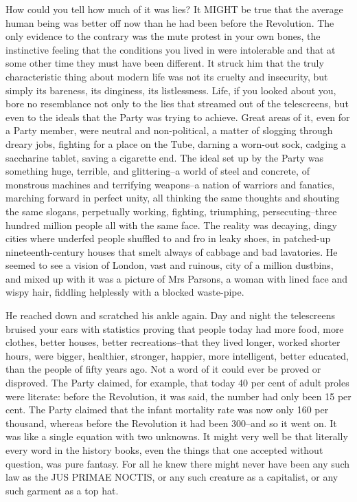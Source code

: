 \documentclass{article}
\begin{document}
How could you tell how much of it was lies? It MIGHT be true that the
average human being was better off now than he had been before the
Revolution. The only evidence to the contrary was the mute protest in your
own bones, the instinctive feeling that the conditions you lived in were
intolerable and that at some other time they must have been different. It
struck him that the truly characteristic thing about modern life was not
its cruelty and insecurity, but simply its bareness, its dinginess, its
listlessness. Life, if you looked about you, bore no resemblance not only
to the lies that streamed out of the telescreens, but even to the ideals
that the Party was trying to achieve. Great areas of it, even for a Party
member, were neutral and non-political, a matter of slogging through dreary
jobs, fighting for a place on the Tube, darning a worn-out sock, cadging
a saccharine tablet, saving a cigarette end. The ideal set up by the
Party was something huge, terrible, and glittering--a world of steel
and concrete, of monstrous machines and terrifying weapons--a nation of
warriors and fanatics, marching forward in perfect unity, all thinking the
same thoughts and shouting the same slogans, perpetually working, fighting,
triumphing, persecuting--three hundred million people all with the same
face. The reality was decaying, dingy cities where underfed people shuffled
to and fro in leaky shoes, in patched-up nineteenth-century houses that
smelt always of cabbage and bad lavatories. He seemed to see a vision of
London, vast and ruinous, city of a million dustbins, and mixed up with it
was a picture of Mrs Parsons, a woman with lined face and wispy hair,
fiddling helplessly with a blocked waste-pipe.

He reached down and scratched his ankle again. Day and night the
telescreens bruised your ears with statistics proving that people today
had more food, more clothes, better houses, better recreations--that they
lived longer, worked shorter hours, were bigger, healthier, stronger,
happier, more intelligent, better educated, than the people of fifty years
ago. Not a word of it could ever be proved or disproved. The Party claimed,
for example, that today 40 per cent of adult proles were literate: before
the Revolution, it was said, the number had only been 15 per cent. The
Party claimed that the infant mortality rate was now only 160 per
thousand, whereas before the Revolution it had been 300--and so it went
on. It was like a single equation with two unknowns. It might very well be
that literally every word in the history books, even the things that one
accepted without question, was pure fantasy. For all he knew there might
never have been any such law as the JUS PRIMAE NOCTIS, or any such creature
as a capitalist, or any such garment as a top hat.
\end{document}
